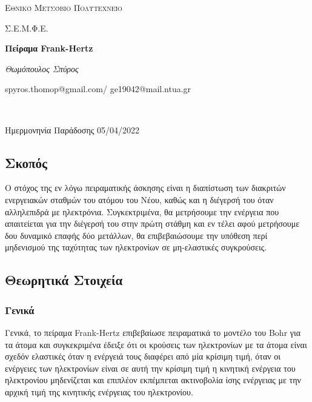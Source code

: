 \documentclass[a4paper]{article}
\begin{document}
\begin{titlepage}			%
	\centering
	{\scshape\LARGE Εθνικό Μετσόβιο Πολυτεχνείο\par}
	{\scshape \LARGE Σ.Ε.Μ.Φ.Ε.\par}
	\vspace{1cm}
	{\huge\bfseries Πείραμα Frank-Hertz \par}
	\vspace{1cm}
	{\Large\itshape Θωμόπουλος Σπύρος\par}		%
	
	{\large spyros.thomop@gmail.com/ ge19042@mail.ntua.gr\par \hfill \\}%
	\vspace{1cm}
	{\large Ημερμονηνία Παράδοσης 05/04/2022\par}
\end{titlepage}

\subsection*{Σκοπός}

	Ο στόχος της εν λόγω πειραματικής άσκησης είναι η διαπίστωση των διακριτών ενεργειακών σταθμών του ατόμου του Νέου, καθώς και η διέγερσή του όταν αλληλεπιδρά με ηλεκτρόνια. Συγκεκτριμένα, θα μετρήσουμε την ενέργεια που απαιτείεται για την διέγερσή του στην πρώτη στάθμη και εν τέλει αφού μετρήσουμε δου δυναμικό επαφής δύο μετάλλων, θα επιβεβαιώσουμε την υπόθεση περί μηδενισμού της ταχύτητας των ηλεκτρονίων σε μη-ελαστικές συγκρούσεις.
	
	
\subsection*{Θεωρητικά Στοιχεία}
	\subsubsection*{Γενικά}
	Γενικά, το πείραμα Frank-Hertz επιβεβαίωσε πειραματικά το μοντέλο του Bohr για τα άτομα και συγκεκριμένα έδειξε ότι οι κρούσεις των ηλεκτρονίων με τα άτομα είναι σχεδόν ελαστικές όταν η ενέργειά τους διαφέρει από μία κρίσιμη τιμή, όταν οι ενέργειες των ηλεκτρονίων είναι σε αυτή την κρίσιμη τιμή η κινητική ενέργεια του ηλεκτρονίου μηδενίζεται και επιπλέον εκπέμπεται ακτινοβολία ίσης ενέργειας με την αρχική τιμή της κινητικής ενέργειας του ηλεκτρονίου.
	
\end{document}
